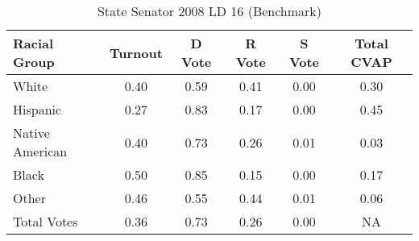 \begin{table}[htb]
\begin{center}
\caption{State Senator 2008 LD 16 (Benchmark)}
\label{stsen08_cvap_ld_16_benchmark}
\begin{tabular}{lccccc}
  \hline
Racial Group & Turnout & D Vote & R Vote & S Vote & Total CVAP \\ 
  \hline
	    White & 0.40  & 0.59  & 0.41  & 0.00  & 0.30 \\
    Hispanic & 0.27  & 0.83  & 0.17  & 0.00  & 0.45 \\
    Native American & 0.40  & 0.73  & 0.26  & 0.01  & 0.03 \\
    Black & 0.50  & 0.85  & 0.15  & 0.00  & 0.17 \\
    Other & 0.46  & 0.55  & 0.44  & 0.01  & 0.06 \\
    Total Votes & 0.36  & 0.73  & 0.26  & 0.00  &  NA \\
   \hline
\end{tabular}
\end{center}
\end{table}